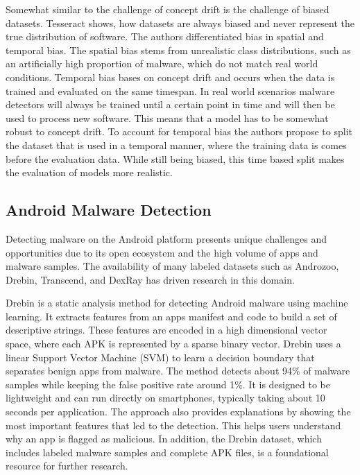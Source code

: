 Somewhat similar to the challenge of concept drift is the challenge of biased datasets.
Tesseract \cite{tesseract} shows, how datasets are always biased and never represent the true distribution of software.
The authors differentiated bias in spatial and temporal bias.
The spatial bias stems from unrealistic class distributions,
such as an artificially high proportion of malware, which do not match real world conditions.
Temporal bias bases on concept drift and 
occurs when the data is trained and evaluated on the same timespan.
In real world scenarios malware detectors will always be trained until a certain point in time and will then be used to 
process new software. This means that a model has to be somewhat robust to concept drift. 
To account for temporal bias the authors propose to split the dataset that is used in a temporal manner, 
where the training data is comes before the evaluation data.
While still being biased, this time based split makes the evaluation of models more realistic.


\subsection{Android Malware Detection}
\label{sec:amd}

Detecting malware on the Android platform presents unique challenges and opportunities due to its open ecosystem 
and the high volume of apps and malware samples. 
The availability of many labeled datasets such as Androzoo, Drebin, Transcend, and DexRay has driven research in this domain.

Drebin \cite{drebin} is a static analysis method for detecting Android malware using machine learning. 
It extracts features from an apps manifest and code to build a set of descriptive strings. 
These features are encoded in a high dimensional vector space, where each APK is represented by a sparse binary vector. 
Drebin uses a linear Support Vector Machine (SVM) to learn a decision boundary that separates benign apps from malware. 
The method detects about 94\% of malware samples while keeping the false positive rate around 1\%. 
It is designed to be lightweight and can run directly on smartphones, typically taking about 10 seconds per application. 
The approach also provides explanations by showing the most important features that led to the detection. 
This helps users understand why an app is flagged as malicious. 
In addition, the Drebin dataset, which includes labeled malware samples and complete APK files, is a foundational 
resource for further research. 

